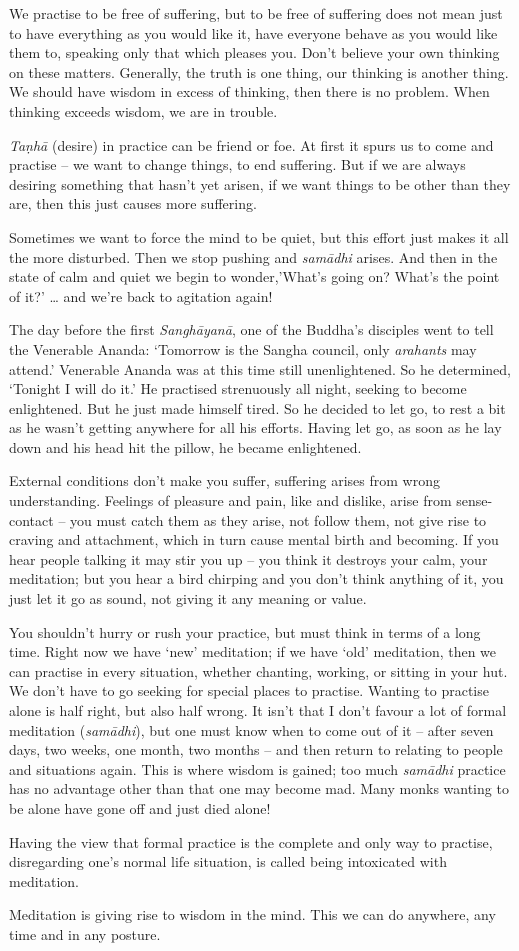 We practise to be free of suffering, but to be free of suffering does
not mean just to have everything as you would like it, have everyone
behave as you would like them to, speaking only that which pleases you. 
Don't believe your own thinking on these matters. Generally, the truth
is one thing, our thinking is another thing. We should have wisdom in
excess of thinking, then there is no problem. When thinking exceeds
wisdom, we are in trouble. 

\emph{Taṇhā} (desire) in practice can be friend or foe. At first it
spurs us to come and practise -- we want to change things, to end
suffering. But if we are always desiring something that hasn't yet
arisen, if we want things to be other than they are, then this just
causes more suffering. 

Sometimes we want to force the mind to be quiet, but this effort just
makes it all the more disturbed. Then we stop pushing and \emph{samādhi}
arises. And then in the state of calm and quiet we begin to
wonder,'What's going on? What's the point of it?' \ldots{} and we're
back to agitation again! 

The day before the first \emph{Sanghāyanā}, one of the Buddha's
disciples went to tell the Venerable Ananda: `Tomorrow is the Sangha
council, only \emph{arahants} may attend.' Venerable Ananda was at this
time still unenlightened. So he determined, `Tonight I will do it.' He
practised strenuously all night, seeking to become enlightened. But he
just made himself tired. So he decided to let go, to rest a bit as he
wasn't getting anywhere for all his efforts. Having let go, as soon as
he lay down and his head hit the pillow, he became enlightened. 

External conditions don't make you suffer, suffering arises from wrong
understanding. Feelings of pleasure and pain, like and dislike, arise
from sense-contact -- you must catch them as they arise, not follow
them, not give rise to craving and attachment, which in turn cause
mental birth and becoming. If you hear people talking it may stir you up
-- you think it destroys your calm, your meditation; but you hear a bird
chirping and you don't think anything of it, you just let it go as
sound, not giving it any meaning or value. 

You shouldn't hurry or rush your practice, but must think in terms of a
long time. Right now we have `new' meditation; if we have `old'
meditation, then we can practise in every situation, whether chanting, 
working, or sitting in your hut. We don't have to go seeking for special
places to practise. Wanting to practise alone is half right, but also
half wrong. It isn't that I don't favour a lot of formal meditation
 (\emph{samādhi}), but one must know when to come out of it -- after
seven days, two weeks, one month, two months -- and then return to
relating to people and situations again. This is where wisdom is gained; 
too much \emph{samādhi} practice has no advantage other than that one
may become mad. Many monks wanting to be alone have gone off and just
died alone! 

Having the view that formal practice is the complete and only way to
practise, disregarding one's normal life situation, is called being
intoxicated with meditation. 

Meditation is giving rise to wisdom in the mind. This we can do
anywhere, any time and in any posture. 

